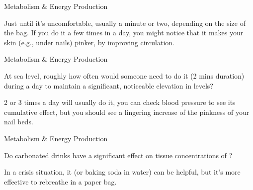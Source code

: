 \documentclass[11pt,oneside,openany,extrafontsizes]{memoir}
\begin{document}
\begin{standalonequote}{Metabolism \& Energy Production}

    \begin{answer}
        Just until it's uncomfortable, usually a minute or two, depending on the size of the bag. If you do it a few times in a day, you might notice that it makes your skin (e.g., under nails) pinker, by improving circulation.
    \end{answer}
\end{standalonequote}

\begin{qaexchange}{Metabolism \& Energy Production}

    \begin{question}
        At sea level, roughly how often would someone need to do it (2 mins duration) during a day to maintain a significant, noticeable elevation in  levels?
    \end{question}

    \begin{answer}
        2 or 3 times a day will usually do it, you can check blood pressure to see its cumulative effect, but you should see a lingering increase of the pinkness of your nail beds.
    \end{answer}
\end{qaexchange}

\begin{qaexchange}{Metabolism \& Energy Production}

    \begin{question}
        Do carbonated drinks have a significant effect on tissue concentrations of ?
    \end{question}

    \begin{answer}
        In a crisis situation, it (or baking soda in water) can be helpful, but it's more effective to rebreathe in a paper bag.
    \end{answer}
\end{qaexchange}
\end{document}
